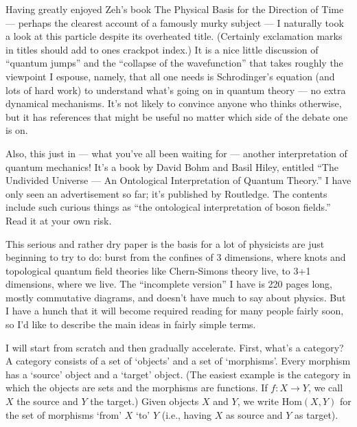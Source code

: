\documentclass{article}
\def\tightlist{}
\renewcommand{\texttt}[1]{%
  \begingroup
  \ttfamily
  \begingroup\lccode`~=`/\lowercase{\endgroup\def~}{/\discretionary{}{}{}}%
  \begingroup\lccode`~=`[\lowercase{\endgroup\def~}{[\discretionary{}{}{}}%
  \begingroup\lccode`~=`.\lowercase{\endgroup\def~}{.\discretionary{}{}{}}%
  \catcode`/=\active\catcode`[=\active\catcode`.=\active
  \scantokens{#1\noexpand}%
  \endgroup
}
\begin{document}
Having greatly enjoyed Zeh's book The Physical Basis for the Direction
of Time --- perhaps the clearest account of a famously murky subject ---
I naturally took a look at this particle despite its overheated title.
(Certainly exclamation marks in titles should add to ones crackpot
index.) It is a nice little discussion of ``quantum jumps'' and the
``collapse of the wavefunction'' that takes roughly the viewpoint I
espouse, namely, that all one needs is Schrodinger's equation (and lots
of hard work) to understand what's going on in quantum theory --- no
extra dynamical mechanisms. It's not likely to convince anyone who
thinks otherwise, but it has references that might be useful no matter
which side of the debate one is on.

Also, this just in --- what you've all been waiting for --- another
interpretation of quantum mechanics! It's a book by David Bohm and Basil
Hiley, entitled ``The Undivided Universe --- An Ontological
Interpretation of Quantum Theory.'' I have only seen an advertisement so
far; it's published by Routledge. The contents include such curious
things as ``the ontological interpretation of boson fields.'' Read it at
your own risk.


This serious and rather dry paper is the basis for a lot of physicists
are just beginning to try to do: burst from the confines of 3
dimensions, where knots and topological quantum field theories like
Chern-Simons theory live, to 3+1 dimensions, where we live. The
``incomplete version'' I have is 220 pages long, mostly commutative
diagrams, and doesn't have much to say about physics. But I have a hunch
that it will become required reading for many people fairly soon, so I'd
like to describe the main ideas in fairly simple terms.

I will start from scratch and then gradually accelerate. First, what's a
category? A category consists of a set of `objects' and a set of
`morphisms'. Every morphism has a `source' object and a `target' object.
(The easiest example is the category in which the objects are sets and
the morphisms are functions. If \(f\colon X\to Y\), we call \(X\) the
source and \(Y\) the target.) Given objects \(X\) and \(Y\), we write
\(\mathrm{Hom}(X,Y)\) for the set of morphisms `from' \(X\) `to' \(Y\)
(i.e., having \(X\) as source and \(Y\) as target).
\end{document}
